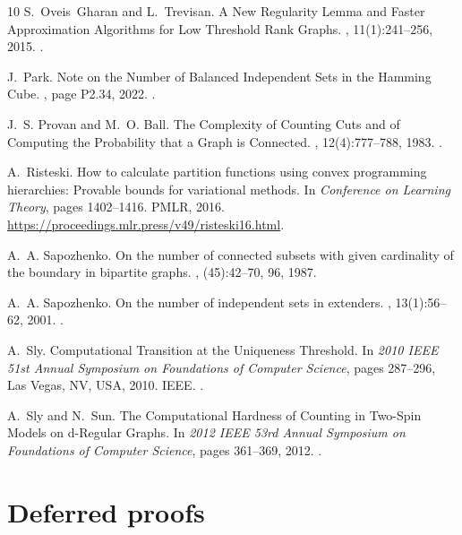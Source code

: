 \documentclass[11pt,letterpaper]{amsart}
\theoremstyle{definition}
\begin{document}
\begin{thebibliography}{10}
S.~Oveis~Gharan and L.~Trevisan.
\newblock A {{New Regularity Lemma}} and {{Faster Approximation Algorithms}}
  for {{Low Threshold Rank Graphs}}.
, 11(1):241--256, 2015.
\newblock {}.

J.~Park.
\newblock Note on the {{Number}} of {{Balanced Independent Sets}} in the
  {{Hamming Cube}}.
, page P2.34, 2022.
\newblock {}.

J.~S. Provan and M.~O. Ball.
\newblock The {{Complexity}} of {{Counting Cuts}} and of {{Computing}} the
  {{Probability}} that a {{Graph}} is {{Connected}}.
, 12(4):777--788, 1983.
\newblock {}.

A.~Risteski.
\newblock How to calculate partition functions using convex programming
  hierarchies: Provable bounds for variational methods.
\newblock In {\em Conference on {{Learning Theory}}}, pages 1402--1416. {PMLR},
  2016.
\newblock \urlprefix\url{https://proceedings.mlr.press/v49/risteski16.html}.

A.~A. Sapozhenko.
\newblock On the number of connected subsets with given cardinality of the
  boundary in bipartite graphs.
, (45):42--70, 96, 1987.

A.~A. Sapozhenko.
\newblock On the number of independent sets in extenders.
, 13(1):56--62, 2001.
\newblock {}.

A.~Sly.
\newblock Computational {{Transition}} at the {{Uniqueness Threshold}}.
\newblock In {\em 2010 {{IEEE}} 51st {{Annual Symposium}} on {{Foundations}} of
  {{Computer Science}}}, pages 287--296, {Las Vegas, NV, USA}, 2010. {IEEE}.
\newblock {}.

A.~Sly and N.~Sun.
\newblock The {{Computational Hardness}} of {{Counting}} in {{Two-Spin Models}}
  on d-{{Regular Graphs}}.
\newblock In {\em 2012 {{IEEE}} 53rd {{Annual Symposium}} on {{Foundations}} of
  {{Computer Science}}}, pages 361--369, 2012.
\newblock {}.

\end{thebibliography}


\appendix
\section{Deferred proofs}\label{app:deferred}
\end{document}
